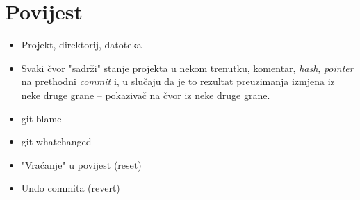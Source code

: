 \chapter*{Povijest}

\begin{itemize}
	\item Projekt, direktorij, datoteka
	\item Svaki čvor "sadrži" stanje projekta u nekom trenutku, komentar, \emph{hash}, \emph{pointer} na prethodni \emph{commit} i, u slučaju da je to rezultat preuzimanja izmjena iz neke druge grane -- pokazivač na čvor iz neke druge grane.
	\item git blame
	\item git whatchanged
	\item "Vraćanje" u povijest (reset)
	\item Undo commita (revert)
\end{itemize}


